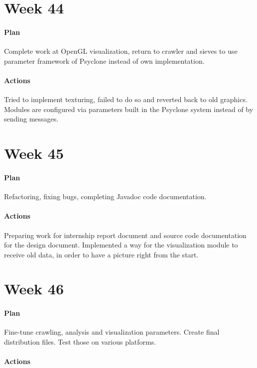 \section{Week 44}

\paragraph{Plan} Complete work at OpenGL visualization, return to crawler and
sieves to use parameter framework of Psyclone instead of own implementation.

\paragraph{Actions} Tried to implement texturing, failed to do so and reverted
back to old graphics. Modules are configured via parameters built in the
Psyclone system instead of by sending messages.

\section{Week 45}

\paragraph{Plan} Refactoring, fixing bugs, completing Javadoc code
documentation.

\paragraph{Actions} Preparing work for internship report document and source
code documentation for the design document. Implemented a way for the
visualization module to receive old data, in order to have a picture right from
the start.

\section{Week 46}

\paragraph{Plan} Fine-tune crawling, analysis and visualization parameters.
Create final distribution files. Test those on various platforms.

\paragraph{Actions} 

